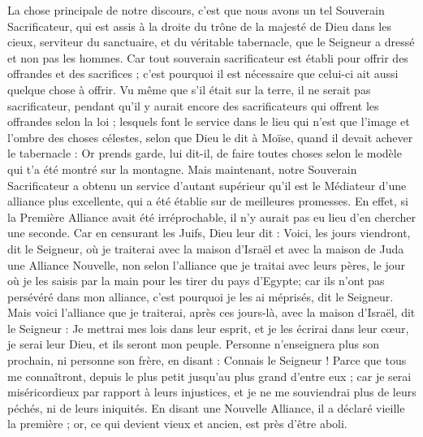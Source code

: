 \begin{multicols}{2}
\VerseOne{}La chose principale de notre discours, c'est que nous avons un tel Souverain Sacrificateur, qui est assis à la droite du trône de la majesté de Dieu dans les cieux,
serviteur du sanctuaire, et du véritable tabernacle, que le Seigneur a dressé et non pas les hommes.
Car tout souverain sacrificateur est établi pour offrir des offrandes et des sacrifices ; c'est pourquoi il est nécessaire que celui-ci ait aussi quelque chose à offrir.
Vu même que s'il était sur la terre, il ne serait pas sacrificateur, pendant qu'il y aurait encore des sacrificateurs qui offrent les offrandes selon la loi ;
lesquels font le service dans le lieu qui n'est que l'image et l'ombre des choses célestes, selon que Dieu le dit à Moïse, quand il devait achever le tabernacle : Or prends garde, lui dit-il, de faire toutes choses selon le modèle qui t'a été montré sur la montagne.
Mais maintenant, notre Souverain Sacrificateur a obtenu un service d'autant supérieur qu'il est le Médiateur d'une alliance plus excellente, qui a été établie sur de meilleures promesses.
En effet, si la Première Alliance avait été irréprochable, il n'y aurait pas eu lieu d'en chercher une seconde.
Car en censurant les Juifs, Dieu leur dit : Voici, les jours viendront, dit le Seigneur, où je traiterai avec la maison d'Israël et avec la maison de Juda une Alliance Nouvelle,
non selon l'alliance que je traitai avec leurs pères, le jour où je les saisis par la main pour les tirer du pays d'Egypte; car ils n'ont pas persévéré dans mon alliance, c'est pourquoi je les ai méprisés, dit le Seigneur.
Mais voici l'alliance que je traiterai, après ces jours-là, avec la maison d'Israël, dit le Seigneur : Je mettrai mes lois dans leur esprit, et je les écrirai dans leur cœur, je serai leur Dieu, et ils seront mon peuple.
Personne n'enseignera plus son prochain, ni personne son frère, en disant : Connais le Seigneur ! Parce que tous me connaîtront, depuis le plus petit jusqu'au plus grand d'entre eux ;
car je serai miséricordieux par rapport à leurs injustices, et je ne me souviendrai plus de leurs péchés, ni de leurs iniquités.
En disant une Nouvelle Alliance, il a déclaré vieille la première ; or, ce qui devient vieux et ancien, est près d'être aboli.

\end{multicols}

